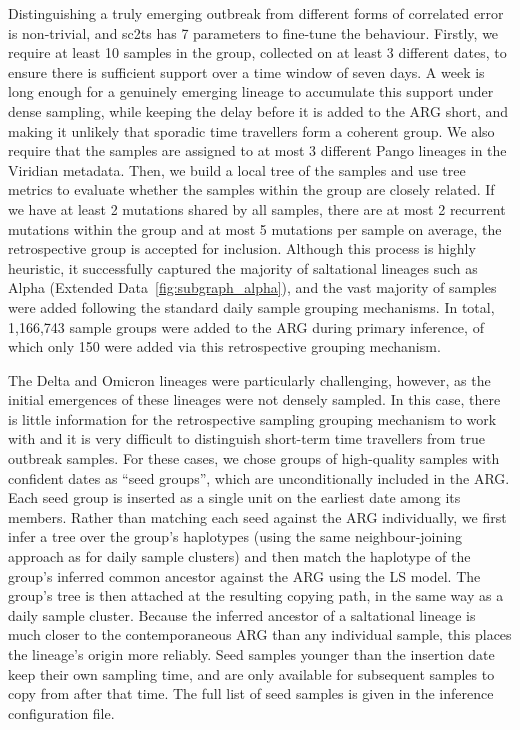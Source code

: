 \documentclass[12pt]{article}
\newcommand{\edref}[1]{Extended Data~\ref{#1}}
\begin{document}
Distinguishing a truly emerging outbreak from different forms of
correlated error is non-trivial, and
sc2ts has 7 parameters to fine-tune the behaviour.
Firstly, we require at least 10 samples in the
group, collected on at least 3 different dates,
to ensure there is sufficient support over a time window of
seven days.
A week is long enough for a genuinely emerging lineage to accumulate
this support under dense sampling, while keeping the delay before it is added
to the ARG short, and making it unlikely that sporadic time travellers
form a coherent group.
We also require that the samples are assigned to at most 3
different Pango lineages in the Viridian metadata.
Then, we build a local tree of the samples and use
tree metrics to evaluate whether the samples within the
group are closely related. If we have at least 2 mutations
shared by all samples, there are at most 2 recurrent mutations
within the group and at most 5 mutations per sample on average,
the retrospective group is accepted for inclusion.
Although this process is highly heuristic, it successfully
captured the majority of saltational lineages
such as Alpha (\edref{fig:subgraph_alpha}), and the
vast majority of samples were added following the standard
daily sample grouping mechanisms.
In total, 1,166,743 sample groups were added to the ARG
during primary inference, of which only 150 were
added via this retrospective grouping mechanism.

The Delta and Omicron lineages were
particularly challenging, however, as the initial emergences of
these lineages were not densely sampled. In this case,
there is little information for the retrospective sampling grouping mechanism
to work with and it is very difficult to distinguish short-term time travellers
from true outbreak samples. For these cases, we chose groups of
high-quality samples with confident dates as ``seed groups'', which are
unconditionally included in the ARG.
Each seed group is inserted as a single unit on the
earliest date among its members.
Rather than matching each seed against the ARG individually,
we first infer a tree over the group's haplotypes
(using the same neighbour-joining approach as for daily sample clusters)
and then match the haplotype of the group's inferred common ancestor
against the ARG using the LS model.
The group's tree is then attached at the resulting copying path,
in the same way as a daily sample cluster.
Because the inferred ancestor of a saltational lineage is much
closer to the contemporaneous ARG than any individual sample,
this places the lineage's origin more reliably.
Seed samples younger than the insertion date keep their own sampling time,
and are only available for subsequent samples to copy from
after that time.
The full list of seed samples is given in the
inference configuration file.
\end{document}
